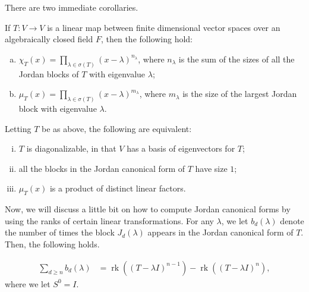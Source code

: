 \documentclass[10pt]{mypackage}
\begin{document}
There are two immediate corollaries.
\begin{corollary}
  If $T\colon V\rightarrow V$ is a linear map between finite dimensional vector spaces over an algebraically closed field $F$, then the following hold:
  \begin{enumerate}[(a)]
    \item $\displaystyle \chi_T(x) = \prod_{\lambda\in \sigma(T)}\left( x-\lambda \right)^{n_{\lambda}}$, where $n_{\lambda}$ is the sum of the sizes of all the Jordan blocks of $T$ with eigenvalue $\lambda$;
    \item $\displaystyle \mu_T(x) = \prod_{\lambda\in \sigma(T)}\left( x-\lambda \right)^{m_{\lambda}}$, where $m_{\lambda}$ is the size of the largest Jordan block with eigenvalue $\lambda$.
  \end{enumerate}
\end{corollary}
\begin{corollary}
  Letting $T$ be as above, the following are equivalent:
  \begin{enumerate}[(i)]
    \item $T$ is diagonalizable, in that $V$ has a basis of eigenvectors for $T$;
    \item all the blocks in the Jordan canonical form of $T$ have size $1$;
    \item $\mu_T(x)$ is a product of distinct linear factors.
  \end{enumerate}
\end{corollary}
Now, we will discuss a little bit on how to compute Jordan canonical forms by using the ranks of certain linear transformations. For any $\lambda$, we let $b_d(\lambda)$ denote the number of times the block $J_d(\lambda)$ appears in the Jordan canonical form of $T$. Then, the following holds.
\begin{theorem}
  \begin{align*}
    \sum_{d\geq n} b_d(\lambda) &= \operatorname{rk}\left( \left( T-\lambda I \right)^{n-1} \right)- \operatorname{rk}\left( \left( T-\lambda I \right)^{n} \right),
  \end{align*}
  where we let $S^{0} = I$.
\end{theorem}
\end{document}
